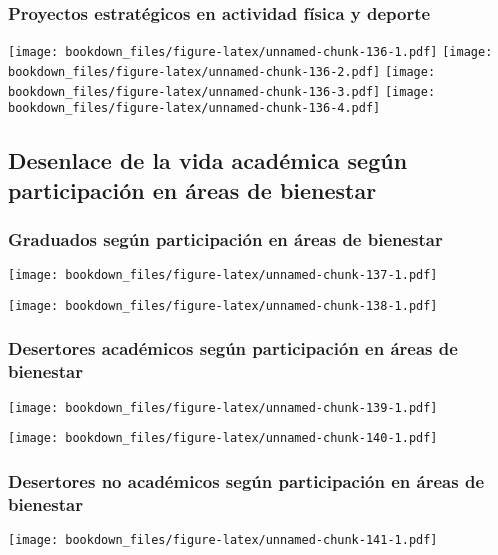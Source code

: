 \documentclass[]{article}
\theoremstyle{definition}
\theoremstyle{definition}
\theoremstyle{definition}
\theoremstyle{remark}
\begin{document}
\subsubsection{Proyectos estratégicos en actividad física y
deporte}\label{proyectos-estrategicos-en-actividad-fisica-y-deporte}

\texttt{[image: bookdown\_files/figure-latex/unnamed-chunk-136-1.pdf]}
\texttt{[image: bookdown\_files/figure-latex/unnamed-chunk-136-2.pdf]}
\texttt{[image: bookdown\_files/figure-latex/unnamed-chunk-136-3.pdf]}
\texttt{[image: bookdown\_files/figure-latex/unnamed-chunk-136-4.pdf]}

\subsection{Desenlace de la vida académica según participación en áreas
de
bienestar}\label{desenlace-de-la-vida-academica-segun-participacion-en-areas-de-bienestar}

\subsubsection{Graduados según participación en áreas de
bienestar}\label{graduados-segun-participacion-en-areas-de-bienestar}

\texttt{[image: bookdown\_files/figure-latex/unnamed-chunk-137-1.pdf]}

\texttt{[image: bookdown\_files/figure-latex/unnamed-chunk-138-1.pdf]}

\subsubsection{Desertores académicos según participación en áreas de
bienestar}\label{desertores-academicos-segun-participacion-en-areas-de-bienestar}

\texttt{[image: bookdown\_files/figure-latex/unnamed-chunk-139-1.pdf]}

\texttt{[image: bookdown\_files/figure-latex/unnamed-chunk-140-1.pdf]}

\subsubsection{Desertores no académicos según participación en áreas de
bienestar}\label{desertores-no-academicos-segun-participacion-en-areas-de-bienestar}

\texttt{[image: bookdown\_files/figure-latex/unnamed-chunk-141-1.pdf]}
\end{document}
